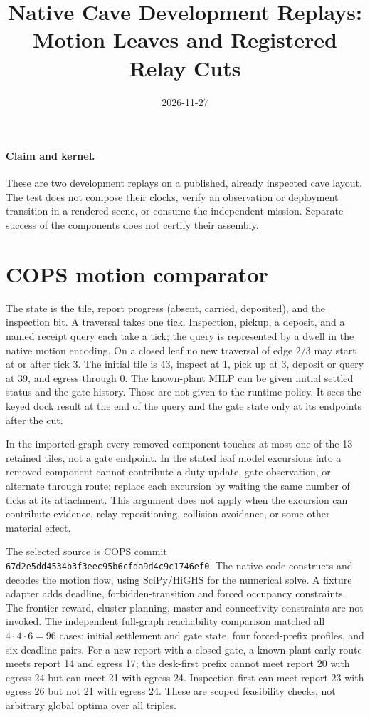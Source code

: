 \documentclass[11pt]{article}
\title{Native Cave Development Replays: Motion Leaves and Registered Relay Cuts}
\date{2026-11-27}
\begin{document}
\maketitle

\paragraph{Claim and kernel.}
These are two development replays on a published, already inspected cave
layout. The test does not compose their clocks, verify an observation or
deployment transition in a rendered scene, or consume the independent
mission. Separate success of the components does not certify their assembly.

\section{COPS motion comparator}

The state is the tile, report progress (absent, carried, deposited), and the
inspection bit. A traversal takes one tick. Inspection, pickup, a deposit,
and a named receipt query each take a tick; the query is represented by a
dwell in the native motion encoding. On a closed leaf no new traversal of
edge \(2/3\) may start at or after tick 3. The initial tile is 43, inspect
at 1, pick up at 3, deposit or query at 39, and egress through 0. The
known-plant MILP can be given initial settled status and the gate history.
Those are not given to the runtime policy. It sees the keyed dock result
at the end of the query and the gate state only at its endpoints after
the cut.

In the imported graph every removed component touches at most one of the
13 retained tiles, not a gate endpoint. In the stated leaf model excursions
into a removed component cannot contribute a duty update, gate observation,
or alternate through route; replace each excursion by waiting the same
number of ticks at its attachment. This argument does not apply when
the excursion can contribute evidence, relay repositioning, collision
avoidance, or some other material effect.

The selected source is COPS commit
\texttt{67d2e5dd4534b3f3eec95b6cfda9d4c9c1746ef0}. The native code
constructs and decodes the motion flow, using SciPy/HiGHS for the numerical
solve. A fixture adapter adds deadline, forbidden-transition and forced
occupancy constraints. The frontier reward, cluster planning, master and
connectivity constraints are not invoked. The independent full-graph
reachability comparison matched all \(4\cdot4\cdot6=96\) cases:
initial settlement and gate state, four forced-prefix profiles, and six
deadline pairs. For a new report with a closed gate, a known-plant
early route meets report 14 and egress 17; the desk-first prefix cannot
meet report 20 with egress 24 but can meet 21 with egress 24.
Inspection-first can meet report 23 with egress 26 but not 21 with
egress 24. These are scoped feasibility checks, not arbitrary global
optima over all triples.
\end{document}
